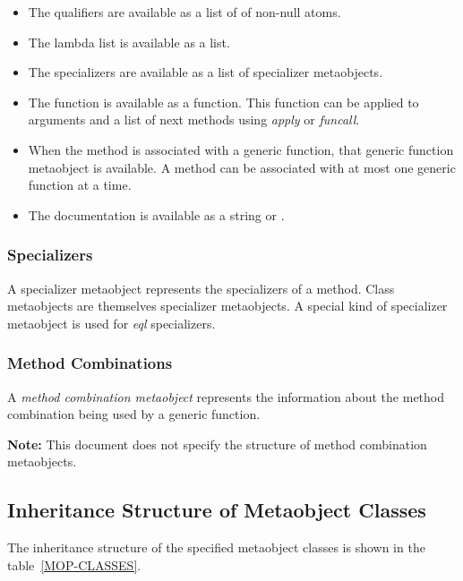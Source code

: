   \begin{itemize}
  \item 
    The qualifiers are available as a list of of non-null atoms.

  \item 
    The lambda list is available as a list.

  \item 
    The specializers are available as a list of specializer metaobjects. 

  \item 
    The function is available as a function. This function can be applied to
    arguments and a list of next methods using \emph{apply} or \emph{funcall}. 

  \item 
    When the method is associated with a generic function, that generic function
    metaobject is available. A method can be associated with at most one generic
    function at a time.

  \item 
    The documentation is available as a string or .
  \end{itemize}


\subsubsection{Specializers}

A specializer metaobject represents the specializers of a method. Class
metaobjects are themselves specializer metaobjects. A special kind of
specializer metaobject is used for \emph{eql} specializers.

\subsubsection{Method Combinations}

A \emph{method combination metaobject} represents the information about the method
combination being used by a generic function. 

\textbf{Note:} This document does not specify the structure of method
combination metaobjects.  

\subsection{Inheritance Structure of Metaobject Classes}

The inheritance structure of the specified metaobject classes is shown in the
table~\ref{MOP-CLASSES}.


